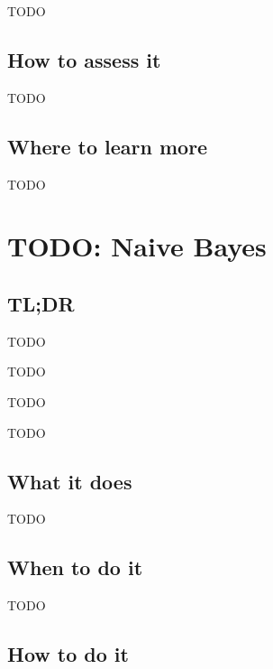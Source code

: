 \documentclass[
]{book}
\providecommand{\tightlist}{%
  \setlength{\itemsep}{0pt}\setlength{\parskip}{0pt}}
\begin{document}
TODO

\hypertarget{how-to-assess-it-4}{%
\section{How to assess it}\label{how-to-assess-it-4}}

TODO

\hypertarget{where-to-learn-more-4}{%
\section{Where to learn more}\label{where-to-learn-more-4}}

TODO

\hypertarget{naive-bayes}{%
\chapter{TODO: Naive Bayes}\label{naive-bayes}}

\hypertarget{tldr-5}{%
\section{TL;DR}\label{tldr-5}}

\begin{description}
\tightlist
\item[What it does]
TODO
\item[When to do it]
TODO
\item[How to do it]
TODO
\item[How to assess it]
TODO
\end{description}

\hypertarget{what-it-does-5}{%
\section{What it does}\label{what-it-does-5}}

TODO

\hypertarget{when-to-do-it-5}{%
\section{When to do it}\label{when-to-do-it-5}}

TODO

\hypertarget{how-to-do-it-5}{%
\section{How to do it}\label{how-to-do-it-5}}
\end{document}
